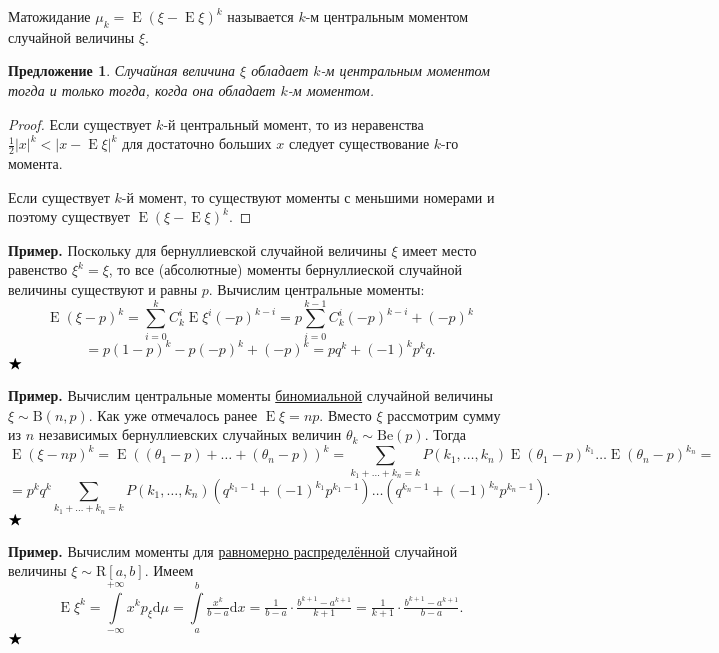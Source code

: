 \documentclass[12pt]{article}
\newtheorem{proposition}[theorem]{Предложение}
\numberwithin{theorem}{section}
\theoremstyle{definition}
\newenvironment{example}{\indent \textbf{Пример.}}{$ \hfill \bigstar $}
\newcommand{\defin}[2]{\hypertarget{#2}{{\color{red} #1}}}
\newcommand{\expect}{\operatorname{E}}
\newcommand{\diff}{\mathrm{d}}
\begin{document}
	Матожидание $ \mu_k = \expect(\xi - \expect\xi)^k $ называется 
	\defin{$ k $-м центральным моментом случайной величины $ \xi $}{central-moment}.
	
	\begin{proposition}
		Случайная величина $ \xi $ обладает $ k $-м центральным моментом
		тогда и только тогда, когда она обладает $ k $-м моментом.
	\end{proposition}
	
	\begin{proof}
		Если существует $ k $-й центральный момент, то из неравенства $ \tfrac{1}{2}|x|^k < |x - \expect\xi|^k $
		для достаточно больших $ x $ следует существование $ k $-го момента.
		
		Если существует $ k $-й момент, то существуют моменты с меньшими номерами
		и поэтому существует $ \expect(\xi - \expect\xi)^k $.
	\end{proof}

	\begin{example}
		Поскольку для бернуллиевской случайной величины $ \xi $ имеет место равенство
		$ \xi^k = \xi $, то все (абсолютные) моменты бернуллиеской случайной величины существуют и равны $ p $.
		Вычислим центральные моменты:
		$$ \expect(\xi - p)^k = \sum\limits_{i = 0}^{k} C_k^i \expect\xi^i (-p)^{k - i}
		= p\sum\limits_{i = 0}^{k - 1} C_k^i (-p)^{k - i} + (-p)^k $$ 
		$$ = p(1 - p)^{k} - p(-p)^k + (-p)^k = pq^k + (-1)^kp^kq. $$
	\end{example}
	
	\begin{example}
		Вычислим центральные моменты 
		\hyperlink{binomial-distribution}{биномиальной} случайной величины $ \xi \sim \mathrm{B}(n, p) $.
		Как уже отмечалось ранее $ \expect\xi = np $.
		Вместо $ \xi $ рассмотрим сумму из $ n $ независимых бернуллиевских случайных величин $ \theta_k \sim \mathrm{Be}(p) $.
		Тогда
		$$ \expect(\xi - np)^k = \expect((\theta_1 - p) + \ldots + (\theta_n - p))^k
		= \sum\limits_{k_1 + \ldots + k_n = k} P(k_1, \ldots, k_n) 
		\expect(\theta_1 - p)^{k_1}\ldots\expect(\theta_n - p)^{k_n} =  $$
		$$ = p^kq^k \sum\limits_{k_1 + \ldots + k_n = k} 
		P(k_1, \ldots, k_n)(q^{k_1 - 1} + (-1)^{k_1}p^{k_1 - 1})\ldots(q^{k_n - 1} + (-1)^{k_n}p^{k_n - 1}). $$
	\end{example}
	
	\begin{example}
		Вычислим моменты для 
		\hyperlink{uniformly-distributed}{равномерно распределённой} случайной величины $ \xi \sim \mathrm{R}[a, b] $.
		Имеем
		$$ \expect\xi^k = \int\limits_{-\infty}^{+\infty} x^k p_\xi \diff\mu
		= \int\limits_{a}^{b} \tfrac{x^k}{b - a} \diff x
		= \tfrac{1}{b - a} \cdot \tfrac{b^{k + 1} - a^{k + 1}}{k + 1}
		= \tfrac{1}{k + 1} \cdot \tfrac{b^{k + 1} - a^{k + 1}}{b - a}. $$
	\end{example}
	
\end{document}
